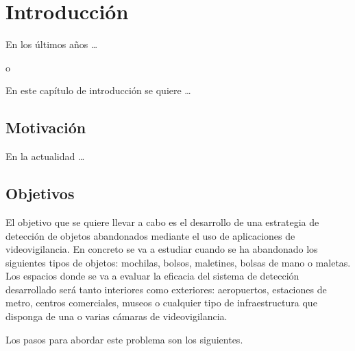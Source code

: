 
\chapter{Introducción}
\label{cha:introduccion}

En los últimos años \ldots

o

En este capítulo de introducción se quiere \ldots

\section{Motivación}
\label{sec:motivacion}

En la actualidad \ldots

\section{Objetivos}
\label{sec:objetivos}

El objetivo que se quiere llevar a cabo es el desarrollo de una estrategia de detección de objetos abandonados mediante el uso de aplicaciones de videovigilancia. En concreto se va a estudiar cuando se ha abandonado los siguientes tipos de objetos: mochilas, bolsos, maletines, bolsas de mano o maletas. Los espacios donde se va a evaluar la eficacia del sistema de detección desarrollado será tanto interiores como exteriores: aeropuertos, estaciones de metro, centros comerciales, museos o cualquier tipo de infraestructura que disponga de una o varias cámaras de videovigilancia. 

Los pasos para abordar este problema son los siguientes.

